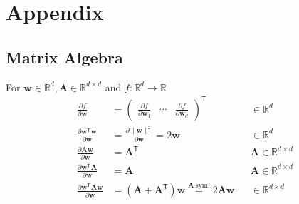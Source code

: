 \section{Appendix}
\subsection{Matrix Algebra}
For $\mathbf{w}\in \mathbb{R}^d, \mathbf{A}\in \mathbb{R}^{d\times d}$ and $ f: \mathbb{R}^d\to \mathbb{R}$
\noindent\begin{align*}
    \frac{\partial f}{\partial \mathbf{w}}                                                                                             & =
    \begin{pmatrix}\frac{\partial f}{\partial \mathbf{w}_1} & \cdots & \frac{\partial f}{\partial \mathbf{w}_d}
    \end{pmatrix}^{\mathsf{T}} &                                                                                                                 & \in \mathbb{R}^d                                                                                                                                                \\[1em]
    \frac{\partial \mathbf{w}^{\mathsf{T}}\mathbf{w}}{\partial \mathbf{w}}                                                             & =\frac{\partial\|\mathbf{w}\|^2}{\partial \mathbf{w}}=2\mathbf{w}                                               &                  & \in \mathbb{R}^d                     \\
    \frac{\partial \mathbf{A}\mathbf{w}}{\partial \mathbf{w}}                                                                          & ={\mathbf{A}}^{\mathsf{T}}                                                                                      &                  & \mathbf{A}\in \mathbb{R}^{d\times d} \\
    \frac{\partial \mathbf{w}^{\mathsf{T}}\mathbf{A}}{\partial \mathbf{w}}                                                             & = \mathbf{A}                                                                                                    &                  & \mathbf{A}\in \mathbb{R}^{d\times d} \\
    \frac{\partial \mathbf{w}^{\mathsf{T}}\mathbf{Aw}}{\partial \mathbf{w}}                                                            & = \left(\mathbf{A}+\mathbf{A}^{\mathsf{T}}\right)\mathbf{w} \overset{\mathbf{A}\ \mathrm{sym.}}{=} 2\mathbf{Aw} &                  & \in \mathbb{R}^{d\times d}
\end{align*}

